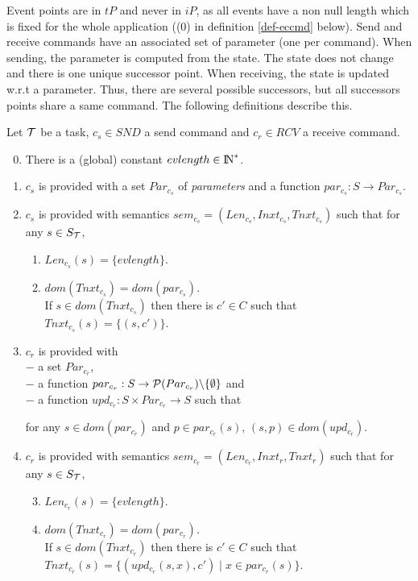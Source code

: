 \documentclass{article}
\newcommand{\NAT}{\mbox{\normalfont I$\!$N}}
\begin{document}
Event points are in $tP$ and never in $iP$, as all events have a non null length which is fixed for the whole application ((0) in definition \ref{def-eccmd} below). Send and receive commands have an associated set of parameter (one per command). When sending, the parameter is computed from the state. The state does not change and there is one unique successor point. When receiving, the state is updated w.r.t a parameter. Thus, there are several possible successors, but all successors points share a same command. The following definitions describe this.
\begin{definition}\label{def-eccmd} Let ${\cal T}$ be a task, $c_s\in S\!N\!D$ a send command and $c_r\in RCV$ a receive command.
\begin{enumerate}
\setcounter{enumi}{-1}
\item There is a (global) constant $evlength\in\NAT^*$. 
\item $c_s$ is provided with a set $Par_{c_s}$ of {\em parameters} and a function $par_{c_s}:S\rightarrow Par_{c_s}$.
\item $c_s$ is provided with semantics $sem_{c_s}=(Len_{c_s},Inxt_{c_s},Tnxt_{c_s})$ such that for any $s\in S_{\cal T}$,
  \begin{enumerate}
  \item $Len_{c_s}(s)=\{evlength\}$.
  \item $dom(T\!nxt_{c_s})=dom(par_{c_s})$.\\
	      If $s\in dom(T\!nxt_{c_s})$ then there is $c'\in C$ such that 
      $T\!nxt_{c_s}(s)=\{(s,c')\}$.
	\end{enumerate}
\item $c_r$ is provided with\\
      $-$ a set $Par_{c_r}$,\\
			$-$ a function $par_{c_r}: S\rightarrow {\cal P}(Par_{c_r})\backslash\{\emptyset\}$ and\\ 
			$-$ a function $upd_{c_r}:S\times Par_{c_r}\rightarrow S$ such that\par
			for any $s\in dom(par_{c_r})$ and $p\in par_{c_r}(s)$, $(s,p)\in dom(upd_{c_r})$.
\item $c_r$ is provided with semantics $sem_{c_r}=(Len_{c_r},Inxt_r,Tnxt_r)$ such that for any $s\in S_{\cal T}$,
  \begin{enumerate}\setcounter{enumii}{2}
\item $Len_{c_r}(s)=\{evlength\}$.
\item $dom(T\!nxt_{c_r})=dom(par_{c_r})$.\\
	    If $s\in dom(T\!nxt_{c_r})$ then there is $c'\in C$ such that
      $T\!nxt_{c_r}(s)=\{(upd_{c_r}(s,x),c')\mid x\in par_{c_r}(s)\}$.
	\end{enumerate}
\end{enumerate}
\end{definition}
\end{document}
